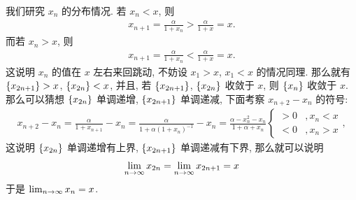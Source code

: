 \begin{exercise}[resume=exer]
\begin{answer}
      我们研究 $ x_{n} $ 的分布情况. 若 $ x_{n} < x $, 则
      \begin{align*}
          x_{n + 1} = \frac{\alpha}{1 + x_{n}} > \frac{\alpha}{1 + x} = x.
      \end{align*}
      而若 $ x_{n} > x $, 则
      \begin{align*}
          x_{n + 1} = \frac{\alpha}{1 + x_{n}} < \frac{\alpha}{1 + x} = x.
      \end{align*}
      这说明 $ x_{n} $ 的值在 $ x $ 左右来回跳动, 不妨设 $ x_{1} > x $, $ x_{1} < x $ 的情况同理. 那么就有 $ \qty{x_{2n + 1}} > x $, $ \qty{x_{2n}} < x $, 并且, 若 $ \qty{x_{2n + 1}} $, $ \qty{x_{2n}} $ 收敛于 $ x $, 则 $ \qty{x_{n}} $ 收敛于 $ x $.
      那么可以猜想 $ \qty{x_{2n}} $ 单调递增, $ \qty{x_{2n + 1}} $ 单调递减, 下面考察 $ x_{n + 2} - x_{n} $ 的符号:
      \begin{align*}
          x_{n + 2} - x_{n} = \frac{\alpha}{1 + x_{n + 1}} - x_{n} = \frac{\alpha}{1 + \alpha(1 + x_{n})^{-1}} - x_{n} = \frac{\alpha - x_{n}^{2} - x_{n}}{1 + \alpha + x_{n}}
          \begin{cases}
              > 0 & , x_{n} < x\\
              < 0 & , x_{n} > x
          \end{cases},
      \end{align*}
      这说明 $ \qty{x_{2n}} $ 单调递增有上界, $ \qty{x_{2n + 1}} $ 单调递减有下界, 那么就可以说明
      \begin{align*}
          \lim_{n \to \infty}x_{2n} = \lim_{n \to \infty}x_{2n + 1} = x
      \end{align*}
      于是 $ \lim_{n \to \infty}x_{n} = x $.
  \end{answer}
\end{exercise}
\stopexercise